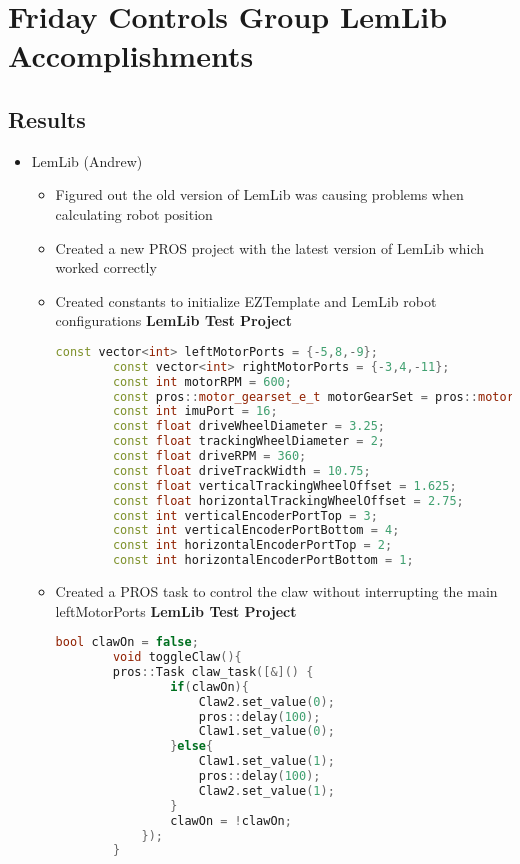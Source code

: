 \section{Friday Controls Group LemLib Accomplishments}

\subsection{Results}
\begin{itemize}
    \item LemLib (Andrew)
    \begin{itemize}
        \item Figured out the old version of LemLib was causing problems when calculating robot position
        \item Created a new PROS project with the latest version of LemLib which worked correctly
        \item Created constants to initialize EZTemplate and LemLib robot configurations
        \textbf{LemLib Test Project}
        \begin{lstlisting}[language=c++]
        const vector<int> leftMotorPorts = {-5,8,-9};
        const vector<int> rightMotorPorts = {-3,4,-11};
        const int motorRPM = 600;
        const pros::motor_gearset_e_t motorGearSet = pros::motor_gearset_e_t::E_MOTOR_GEAR_600;
        const int imuPort = 16;
        const float driveWheelDiameter = 3.25;
        const float trackingWheelDiameter = 2;
        const float driveRPM = 360;
        const float driveTrackWidth = 10.75;
        const float verticalTrackingWheelOffset = 1.625;
        const float horizontalTrackingWheelOffset = 2.75;
        const int verticalEncoderPortTop = 3;
        const int verticalEncoderPortBottom = 4;
        const int horizontalEncoderPortTop = 2;
        const int horizontalEncoderPortBottom = 1;
        \end{lstlisting}

        \item Created a PROS task to control the claw without interrupting the main leftMotorPorts
        \textbf{LemLib Test Project}
        \begin{lstlisting}[language=c++]
        bool clawOn = false;
        void toggleClaw(){
        pros::Task claw_task([&]() {
                if(clawOn){
                    Claw2.set_value(0);
                    pros::delay(100);
                    Claw1.set_value(0);
                }else{
                    Claw1.set_value(1);
                    pros::delay(100);
                    Claw2.set_value(1);
                }
                clawOn = !clawOn;
            });
        }
        \end{lstlisting}
    \end{itemize}
\end{itemize}

